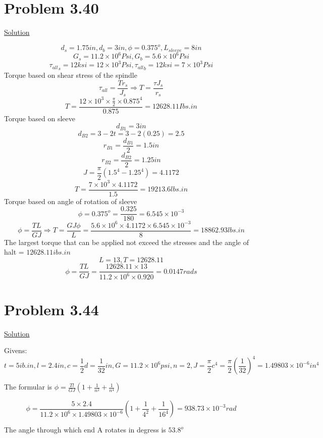 \documentclass{article}
\begin{document}
\section*{Problem 3.40}
\begin{center}\underline{Solution}\end{center}
\[d_{s} = 1.75in, d_{b} = 3in, \phi = 0.375^{o},L_{sleeve} = 8in\]
\[G_{s} = 11.2\times10^{6}Psi, G_{b} = 5.6\times10^{6}Psi\]
\[ {{\tau_{all}}_{s}}=12ksi = 12\times10^{3}Psi,  {{\tau_{all}}_{b}}=12ksi = 7\times10^{3}Psi\]
Torque based on shear stress of the spindle
\[\tau_{all} = \frac{Tr_{s}}{J_{s}} \Rightarrow T = \frac{\tau J_{s}}{r_{s}}\]
\[T = \frac{12\times10^{3}\times\frac{\pi}{2}\times{0.875}^{4}}{0.875} = 12628.11Ibs.in\]
Torque based on sleeve 
\[d_{B1} = 3in\]
\[d_{B2} = 3-2t = 3-2(0.25) = 2.5\]
\[r_{B1} = \frac{d_{B1}}{2} = 1.5in\]
\[r_{B2} = \frac{d_{B2}}{2} =1.25in\]
\[J = \frac{\pi}{2}(1.5^{4} - 1.25^{4}) = 4.1172\]
\[T = \frac{7\times10^{3}\times4.1172}{1.5} = 19213.6lbs.in\]
Torque based on angle of rotation of sleeve
\[\phi = 0.375^{o} = \frac{0.325}{180} = 6.545\times10^{-3}\]
\[\phi = \frac{TL}{GJ} \Rightarrow T= \frac{GJ\phi}{L} = \frac{5.6\times10^{6}\times4.1172\times6.545\times10^{-3}}{8} = 18862.93lbs.in\]
The largest torque that can be applied not exceed the stresses and the angle of halt = $12628.11ibs.in$
\[L = 13, T = 12628.11\]
\[\phi = \frac{TL}{GJ} = \frac{12628.11\times13}{11.2\times10^{6}\times0.920} = 0.0147rads\]


\section*{Problem 3.44}

\begin{center}\underline{Solution}\end{center}
Givens: \[t = 5ib.in, l=2.4in, c=\frac{1}{2}d = \frac{1}{32}in, G = 11.2\times10^{6}psi, n = 2, J = \frac{\pi}{2}c^{4} =  \frac{\pi}{2}{(\frac{1}{32})}^{4} = 1.49803\times10^{-6}in^{4}\]
\begin{center}The formular is $\phi = \frac{Tl}{GJ}(1 + \frac{1}{n^{2}}+  \frac{1}{n^{4}})$\end{center}
\[\phi = \frac{5\times2.4}{11.2\times10^{6}\times1.49803\times10^{-6}}(1 + \frac{1}{4^{2}}+  \frac{1}{16^{4}}) = 938.73\times10^{-3}rad\]
\begin{center} The angle through which end A rotates in degress is $53.8^{o}$\end{center}
\end{document}

